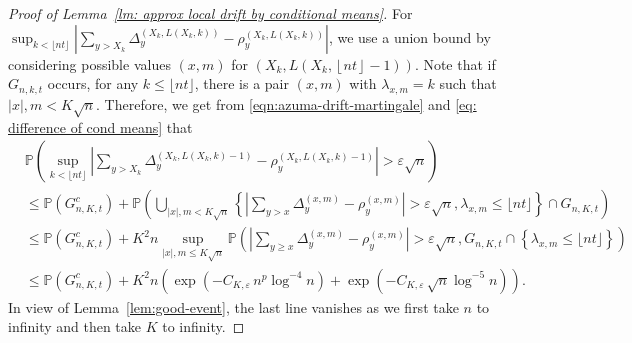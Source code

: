 \documentclass[twoside,12pt, a4paper]{article}
\numberwithin{equation}{section}
\theoremstyle{remark}
\newcommand{\abs}[1]{\left\vert #1 \right\vert}
\begin{document}
\begin{proof}[Proof of Lemma~\ref{lm: approx local drift by conditional means}]
	For $\sup_{k <\lfloor nt \rfloor} \left| \sum_{y > X_k} \Delta_y^{\left(X_k,L(X_k, k)\right)} - \rho_y^{\left(X_k,L(X_k, k)\right)} \right|$, we use a union bound by considering possible values $(x,m)$ for $\left(X_k, L\left(X_k, \left\lfloor nt  \right\rfloor - 1\right)\right)$. Note that if $G_{n,k,t}$ occurs, for any $k\leq \lfloor nt \rfloor$, there is a pair $(x,m)$ with $\lambda_{x,m}=k$ such that $\abs{x},m <K\sqrt{n}$. Therefore, we get from \eqref{eqn:azuma-drift-martingale} and \eqref{eq: difference of cond means} that 
	\begin{align*}
		& \mathbb{P}\left( \sup_{k <\lfloor nt \rfloor} \left| \sum_{y > X_k} 
		\Delta_y^{\left(X_k,L(X_k, k)-1\right)} - \rho_y^{\left(X_k,L(X_k, k)-1\right)}
		\right| > \varepsilon \sqrt{n}  \right) \\
		&\le \mathbb{P}(G_{n, K, t}^c) + \mathbb{P}\left( \bigcup_{|x|, m < K \sqrt{n} } \left\{  \left| \sum_{y > x} \Delta_y^{(x,m)} - \rho_y^{(x,m)} \right|  > \varepsilon \sqrt{n},  \lambda_{x,m} \leq\lfloor nt \rfloor \right\} \cap G_{n,K,t} \right) \\
		&\le \mathbb{P}(G_{n, K, t}^c) + K^2 n \sup _{|x|, m \le  K \sqrt{n} }
		\mathbb{P}\left( \left| \sum_{y \ge x} \Delta_y^{(x,m)} - \rho_y^{(x,m)} \right|  > \varepsilon \sqrt{n} , G_{n,K,t}\cap \left\{\lambda_{x,m} \leq\lfloor nt \rfloor \right\}  \right) \\
		&\le \mathbb{P}(G_{n, K, t}^c) + K^2 n \left( \exp\left( - C_{K, \varepsilon} \, n^{p } \log^{-4} n \right) + \exp\left( - C_{K, \varepsilon} \, \sqrt{n}  \log^{-5} n \right)\right) 
		.\end{align*}
	In view of Lemma~\ref{lem:good-event}, the last line vanishes as we first take $n$ to infinity and then take $K$ to infinity.
\end{proof}



\printbibliography
\end{document}
